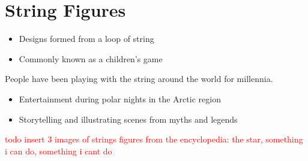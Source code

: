 \section{String Figures}

\begin{frame}{\secname}
\begin{itemize}
    \item Designs formed from a loop of string
    \item Commonly known as a children's game
\end{itemize}

\pause People have been playing with the string around the world for millennia.

\begin{itemize}[<+(1)->]
    \item  Entertainment during polar nights in the Arctic region
    \item  Storytelling and illustrating scenes from myths and legends
\end{itemize}

\pause \textcolor{red}{todo insert 3 images of strings figures from the encyclopedia: the star, something i can do, something i cant do}

\end{frame}



